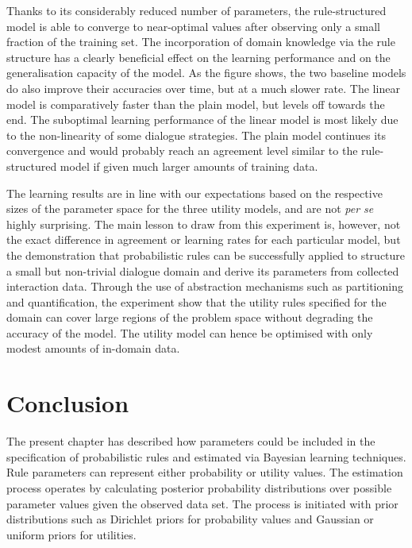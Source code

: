 Thanks to its considerably reduced number of parameters, the rule-structured model is able to converge to near-optimal values after observing only a small fraction of the training set.  The incorporation of domain knowledge via the rule structure has a clearly beneficial effect on the learning performance and on the generalisation capacity of the model.  As the figure shows, the two baseline models do also improve their accuracies over time, but at a much slower rate.   The linear model is comparatively faster than the plain model, but levels off towards the end. The suboptimal learning performance of the linear model is most likely due to the non-linearity of some dialogue strategies.  The plain model continues its convergence and would probably reach an agreement level similar to the rule-structured model if given much larger amounts of training data. 

The learning results are in line with our expectations based on the respective sizes of the parameter space for the three utility models, and are not \textit{per se} highly surprising.  The main lesson to draw from this experiment is, however, not the exact difference in agreement or learning rates for each particular model, but the demonstration that probabilistic rules can be successfully applied to structure a small but non-trivial dialogue domain and derive its parameters from collected interaction data.  Through the use of abstraction mechanisms such as partitioning and quantification, the experiment show that the utility rules specified for the domain can cover large regions of the problem space without degrading the accuracy of the model.  The utility model can hence be optimised with only modest amounts of in-domain data. 


\section{Conclusion}
\label{sec:woz-conclusions}

The present chapter has described how parameters could be included in the specification of probabilistic rules and estimated via Bayesian learning techniques.  Rule parameters can represent either probability or utility values. The estimation process operates by calculating posterior probability distributions over possible parameter values given the observed data set. The process is initiated with prior distributions such as Dirichlet priors for probability values and Gaussian or uniform priors for utilities. 

